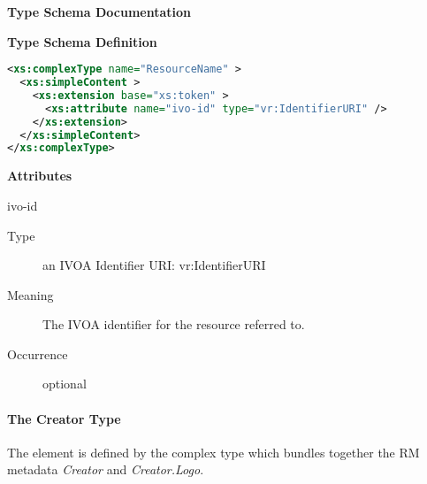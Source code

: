 \documentclass[11pt,a4paper]{ivoa}
\begin{document}
\begin{generated}
\begingroup
      	\renewcommand*\descriptionlabel[1]{%
      	\hbox to 5.5em{\emph{#1}\hfil}}\vspace{2ex}\noindent\textbf{ Type Schema Documentation}


\vspace{1ex}\noindent\textbf{ Type Schema Definition}

\begin{lstlisting}[language=XML,basicstyle=\footnotesize]
<xs:complexType name="ResourceName" >
  <xs:simpleContent >
    <xs:extension base="xs:token" >
      <xs:attribute name="ivo-id" type="vr:IdentifierURI" />
    </xs:extension>
  </xs:simpleContent>
</xs:complexType>
\end{lstlisting}

\vspace{0.5ex}\noindent\textbf{ Attributes}

\begingroup\small\begin{bigdescription}
\item[ivo-id]
\begin{description}
\item[Type] an IVOA Identifier URI: vr:IdentifierURI
\item[Meaning] 
                The IVOA identifier for the resource referred to.
              
\item[Occurrence] optional

\end{description}


\end{bigdescription}\endgroup

\endgroup
\end{generated}



\paragraph{The Creator Type}

The  element is defined by the  complex
type which bundles together the RM metadata \emph{Creator} and
\emph{Creator.Logo}.
\end{document}
